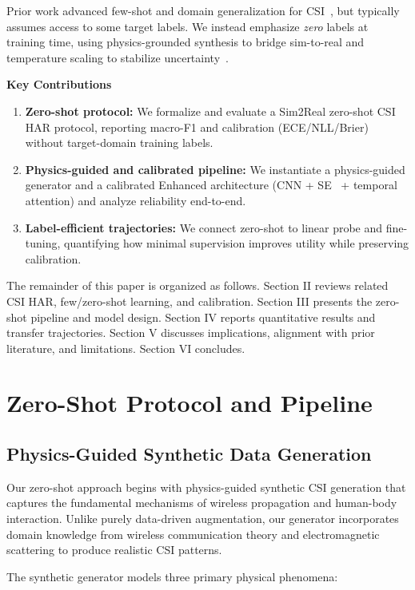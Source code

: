 \documentclass[journal]{IEEEtran}
\begin{document}
Prior work advanced few-shot and domain generalization for CSI~\cite{fewsense2022,airfi2022}, but typically assumes access to some target labels. We instead emphasize \emph{zero} labels at training time, using physics-grounded synthesis to bridge sim-to-real and temperature scaling to stabilize uncertainty~\cite{calibration_guo2017}.

\textbf{Key Contributions}
\begin{enumerate}
  \item \textbf{Zero-shot protocol:} We formalize and evaluate a Sim2Real zero-shot CSI HAR protocol, reporting macro-F1 and calibration (ECE/NLL/Brier) without target-domain training labels.
  \item \textbf{Physics-guided and calibrated pipeline:} We instantiate a physics-guided generator and a calibrated Enhanced architecture (CNN + SE~\cite{se_networks2018} + temporal attention) and analyze reliability end-to-end.
  \item \textbf{Label-efficient trajectories:} We connect zero-shot to linear probe and fine-tuning, quantifying how minimal supervision improves utility while preserving calibration.
\end{enumerate}

The remainder of this paper is organized as follows. Section II reviews related CSI HAR, few/zero-shot learning, and calibration. Section III presents the zero-shot pipeline and model design. Section IV reports quantitative results and transfer trajectories. Section V discusses implications, alignment with prior literature, and limitations. Section VI concludes.

\section{Zero-Shot Protocol and Pipeline}

\subsection{Physics-Guided Synthetic Data Generation}
Our zero-shot approach begins with physics-guided synthetic CSI generation that captures the fundamental mechanisms of wireless propagation and human-body interaction. Unlike purely data-driven augmentation, our generator incorporates domain knowledge from wireless communication theory and electromagnetic scattering to produce realistic CSI patterns.

The synthetic generator models three primary physical phenomena:
\end{document}
